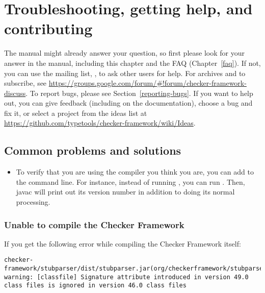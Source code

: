 \htmlhr
\chapter{Troubleshooting, getting help, and contributing\label{troubleshooting}}

\begin{sloppypar}
The manual might already answer your question, so first please look for
your answer in the manual,
including this chapter and the FAQ (Chapter~\ref{faq}).
If not, you can use the mailing list,
, to ask other users for
help.  For archives and to subscribe, see \url{https://groups.google.com/forum/#!forum/checker-framework-discuss}.
To report bugs, please see Section~\ref{reporting-bugs}.
If you want to help out, you can give feedback (including on the
documentation), choose a bug and fix it, or select a
project from the ideas list at
\url{https://github.com/typetools/checker-framework/wiki/Ideas}.
\end{sloppypar}


\section{Common problems and solutions\label{common-problems}}

\begin{itemize}
\item
To verify that you are using the compiler you think you are, you can add
 to the command line.  For instance, instead of running
, you can run .  Then, javac will print out its version number in addition
to doing its normal processing.

\end{itemize}


\subsection{Unable to compile the Checker Framework\label{common-problems-compiling}}

If you get the following error while compiling the Checker Framework itself:

\begin{smaller}
\begin{Verbatim}
checker-framework/stubparser/dist/stubparser.jar(org/checkerframework/stubparser/ast/CompilationUnit.class):
warning: [classfile] Signature attribute introduced in version 49.0 class files is ignored in version 46.0 class files
\end{Verbatim}
\end{smaller}

